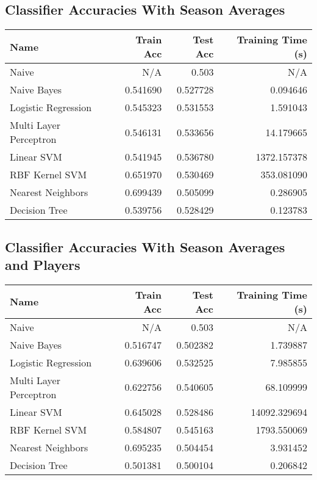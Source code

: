 \documentclass[10pt, oneside]{article}   	%
\begin{document}
\subsection*{Classifier Accuracies With Season Averages}
\begin{tabular}{lrrr}
\toprule
                   Name &  Train Acc &  Test Acc &  Training Time (s) \\
\midrule
                  Naive &        N/A &       0.503 &                N/A \\
            Naive Bayes &   0.541690 &  0.527728 &           0.094646 \\
    Logistic Regression &   0.545323 &  0.531553 &           1.591043 \\
 Multi Layer Perceptron &   0.546131 &  0.533656 &          14.179665 \\
             Linear SVM &   0.541945 &  0.536780 &        1372.157378 \\
         RBF Kernel SVM &   0.651970 &  0.530469 &         353.081090 \\
      Nearest Neighbors &   0.699439 &  0.505099 &           0.286905 \\
          Decision Tree &   0.539756 &  0.528429 &           0.123783 \\
\bottomrule
\end{tabular}



\subsection*{Classifier Accuracies With Season Averages and Players}
\begin{tabular}{lrrr}
\toprule
                   Name &  Train Acc &  Test Acc &  Training Time (s) \\
\midrule
                  Naive &        N/A &       0.503 &                N/A \\
            Naive Bayes &   0.516747 &  0.502382 &           1.739887 \\
    Logistic Regression &   0.639606 &  0.532525 &           7.985855 \\
 Multi Layer Perceptron &   0.622756 &  0.540605 &          68.109999 \\
             Linear SVM &   0.645028 &  0.528486 &       14092.329694 \\
         RBF Kernel SVM &   0.584807 &  0.545163 &        1793.550069 \\
      Nearest Neighbors &   0.695235 &  0.504454 &           3.931452 \\
          Decision Tree &   0.501381 &  0.500104 &           0.206842 \\
\bottomrule
\end{tabular}
\end{document}
